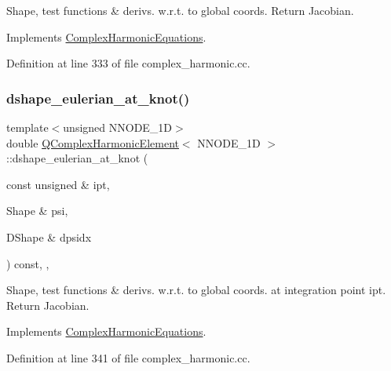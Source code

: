 Shape, test functions \& derivs. w.\+r.\+t. to global coords. Return Jacobian. 



Implements \hyperlink{classComplexHarmonicEquations_a59048c598e2fba3e11aa5985ffaf4d76}{Complex\+Harmonic\+Equations}.



Definition at line 333 of file complex\+\_\+harmonic.\+cc.

\mbox{\label{classQComplexHarmonicElement_a3f8d1d9396135d4d86f416dcf6c23904}} 
\subsubsection{\texorpdfstring{dshape\+\_\+eulerian\+\_\+at\+\_\+knot()}{dshape\_eulerian\_at\_knot()}}
{\footnotesize\ttfamily template$<$unsigned N\+N\+O\+D\+E\+\_\+1D$>$ \\
double \hyperlink{classQComplexHarmonicElement}{Q\+Complex\+Harmonic\+Element}$<$ N\+N\+O\+D\+E\+\_\+1D $>$\+::dshape\+\_\+eulerian\+\_\+at\+\_\+knot (\begin{DoxyParamCaption}\item[{const unsigned \&}]{ipt,  }\item[{Shape \&}]{psi,  }\item[{D\+Shape \&}]{dpsidx }\end{DoxyParamCaption}) const\hspace{0.3cm}{\ttfamily [inline]}, {\ttfamily [protected]}, {\ttfamily [virtual]}}



Shape, test functions \& derivs. w.\+r.\+t. to global coords. at integration point ipt. Return Jacobian. 



Implements \hyperlink{classComplexHarmonicEquations_a60c71828f2d4c1c2363dcb1d1f334fff}{Complex\+Harmonic\+Equations}.



Definition at line 341 of file complex\+\_\+harmonic.\+cc.

\mbox{\label{classQComplexHarmonicElement_a8c45d7281a7bc7e2e2d53a7f87339ca4}} 
